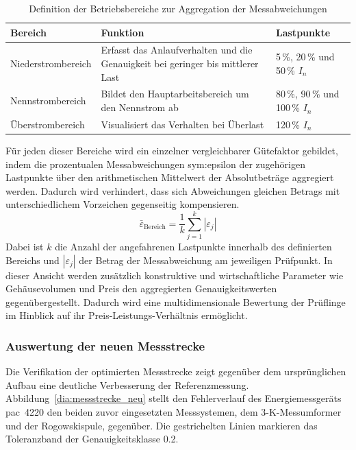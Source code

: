 \begin{table}[H]
    \centering
    \caption{Definition der Betriebsbereiche zur Aggregation der Messabweichungen}
    \label{tab:betriebsbereiche}
    \begin{tabularx}{\textwidth}{@{}l X l@{}}
        \toprule
        \textbf{Bereich}   & \textbf{Funktion} & \textbf{Lastpunkte} \\
        \midrule
        Niederstrombereich & 
        Erfasst das Anlaufverhalten und die Genauigkeit bei geringer bis mittlerer Last & 
        5\,\%, 20\,\% und 50\,\% $I_n$ \\
        \addlinespace
        Nennstrombereich   & 
        Bildet den Hauptarbeitsbereich um den Nennstrom ab & 
        80\,\%, 90\,\% und 100\,\% $I_n$ \\
        \addlinespace
        Überstrombereich   & 
        Visualisiert das Verhalten bei Überlast & 
        120\,\% $I_n$ \\
        \bottomrule
    \end{tabularx}
\end{table}


Für jeden dieser Bereiche wird ein einzelner vergleichbarer Gütefaktor gebildet, indem die prozentualen Messabweichungen \gls{sym:epsilon} der zugehörigen Lastpunkte über den arithmetischen Mittelwert der Absolutbeträge aggregiert werden. Dadurch wird verhindert, dass sich Abweichungen gleichen Betrags mit unterschiedlichem Vorzeichen gegenseitig kompensieren.
\begin{equation}
    \label{eq:fehler_bereich}
    \bar{\varepsilon}_{\text{Bereich}} = \frac{1}{k} \sum_{j=1}^{k} |\varepsilon_j|
\end{equation}
Dabei ist $k$ die Anzahl der angefahrenen Lastpunkte innerhalb des definierten Bereichs und $|\varepsilon_j|$ der Betrag der Messabweichung am jeweiligen Prüfpunkt. In dieser Ansicht werden zusätzlich konstruktive und wirtschaftliche Parameter wie Gehäusevolumen und Preis den aggregierten Genauigkeitswerten gegenübergestellt. Dadurch wird eine multidimensionale Bewertung der Prüflinge im Hinblick auf ihr Preis-Leistungs-Verhältnis ermöglicht.



\subsubsection{Auswertung der neuen Messstrecke}
\label{sec:auswertung_messstrecke}

Die Verifikation der optimierten Messstrecke zeigt gegenüber dem ursprünglichen Aufbau eine deutliche Verbesserung der Referenzmessung. Abbildung~\ref{dia:messstrecke_neu} stellt den Fehlerverlauf des Energiemessgeräts \gls{pac}~4220 den beiden zuvor eingesetzten Messsystemen, dem 3-K-Messumformer und der Rogowskispule, gegenüber. Die gestrichelten Linien markieren das Toleranzband der Genauigkeitsklasse \num{0,2}.



